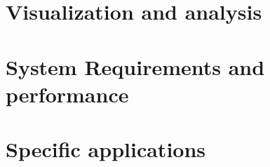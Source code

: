 \documentclass[a4paper,11pt]{report}
\newcommand{\NextFile}[1]{}
\def\umbruch{\vfill\eject}
\def\umbruch{\relax}
\begin{document}
\chapter{Visualization and analysis}
%
\NextFile{SystemRequirements.html}
\chapter{System Requirements and performance}

%
\NextFile{PolicyMeasures.html}
\chapter{Specific applications}


%






\umbruch
\end{document}
